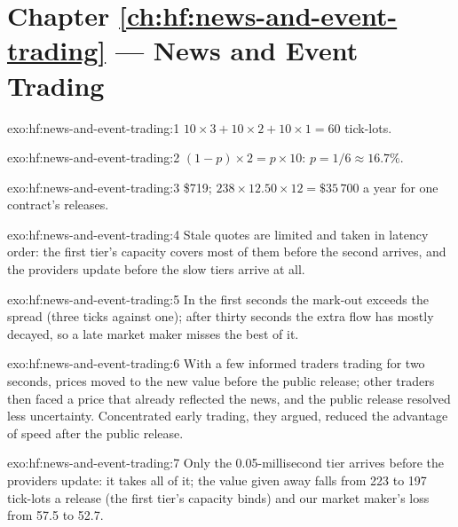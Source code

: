 \section*{Chapter \ref{ch:hf:news-and-event-trading} --- News and Event Trading}

\begin{solution}{exo:hf:news-and-event-trading:1}
$10\times3+10\times2+10\times1=60$ tick-lots.
\end{solution}

\begin{solution}{exo:hf:news-and-event-trading:2}
$(1-p)\times2=p\times10$: $p=1/6\approx16.7\%$.
\end{solution}

\begin{solution}{exo:hf:news-and-event-trading:3}
\$719; $238\times12.50\times12=\$35\,700$ a year for one contract's releases.
\end{solution}

\begin{solution}{exo:hf:news-and-event-trading:4}
Stale quotes are limited and taken in latency order: the first tier's capacity covers most of them before the second arrives, and the providers
update before the slow tiers arrive at all.
\end{solution}

\begin{solution}{exo:hf:news-and-event-trading:5}
In the first seconds the mark-out exceeds the spread (three ticks against one); after thirty seconds the extra flow has mostly decayed, so a late
market maker misses the best of it.
\end{solution}

\begin{solution}{exo:hf:news-and-event-trading:6}
With a few informed traders trading for two seconds, prices moved to the new value before the public release; other traders then faced a price that
already reflected the news, and the public release resolved less uncertainty. Concentrated early trading, they argued, reduced the advantage of
speed after the public release.
\end{solution}

\begin{solution}{exo:hf:news-and-event-trading:7}
Only the 0.05-millisecond tier arrives before the providers update: it takes all of it; the value given away falls from 223 to 197 tick-lots a
release (the first tier's capacity binds) and our market maker's loss from 57.5 to 52.7.
\end{solution}

